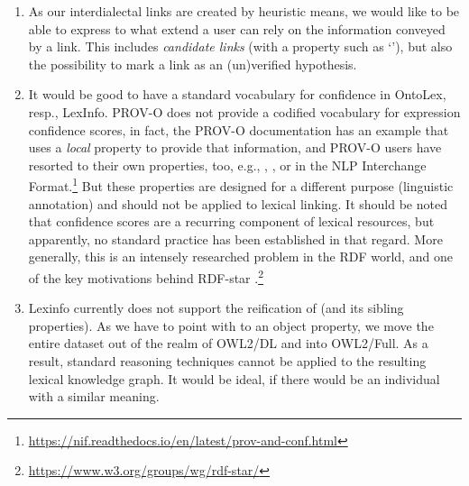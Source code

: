 \begin{enumerate}
\item As our interdialectal links are created by heuristic means, we would like to be able to express to what extend a user can rely on the information conveyed by a link. This includes \emph{candidate links} (with a property such as `'), but also the possibility to mark a link as an (un)verified %
hypothesis.
\item It would be good to have a standard vocabulary for confidence in OntoLex, resp., LexInfo. 
PROV-O \cite{jing2015prov} does not provide a codified vocabulary for expression confidence scores, in fact, the PROV-O documentation has an example that uses a \emph{local} property to provide that information, and PROV-O users have resorted to their own properties, too, e.g., , , or  in the NLP Interchange Format.\footnote{\url{https://nif.readthedocs.io/en/latest/prov-and-conf.html}} But these properties are designed for a different purpose (linguistic annotation) and should not be applied to lexical linking. It should be noted that confidence scores are a recurring component of lexical resources, but apparently, no standard practice has been established in that regard.
More generally, this is an intensely researched problem in the RDF world, and one of the key motivations behind RDF-star \cite{rupp2024implementing}.\footnote{\url{https://www.w3.org/groups/wg/rdf-star/}}
\item Lexinfo currently does not support the reification of  (and its sibling properties). As we have to point with  to an object property, we move the entire dataset out of the realm of OWL2/DL and into OWL2/Full. As a result, standard reasoning techniques cannot be applied to the resulting lexical knowledge graph. It would be ideal, if there would be an individual with a similar meaning.
\end{enumerate}

